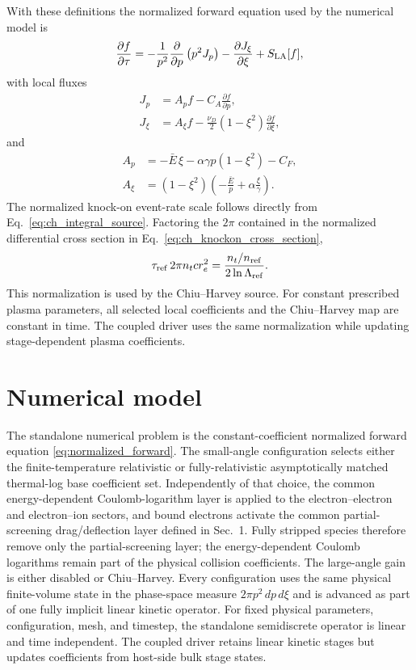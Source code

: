 \documentclass[11pt]{article}
\begin{document}
With these definitions the normalized forward equation used by the numerical model is
\begin{equation}
 \frac{\partial f}{\partial\tau}
 =-\frac{1}{p^2}\frac{\partial}{\partial p}\left(p^2J_p\right)
  -\frac{\partial J_\xi}{\partial\xi}
  +S_{\rm LA}[f],
 \label{eq:normalized_forward}
\end{equation}
with local fluxes
\begin{align}
 J_p
 &=A_p f-C_A\frac{\partial f}{\partial p},
 \label{eq:normalized_Jp}\\
 J_\xi
 &=A_\xi f
   -\frac{\nu_D}{2}(1-\xi^2)\frac{\partial f}{\partial\xi},
 \label{eq:normalized_Jxi}
\end{align}
and
\begin{align}
 A_p
 &=-\bar E\,\xi
   -\alpha\gamma p(1-\xi^2)
   -C_F,
 \label{eq:normalized_Ap}\\
 A_\xi
 &=(1-\xi^2)
   \left(-\frac{\bar E}{p}+\alpha\frac{\xi}{\gamma}\right).
 \label{eq:normalized_Axi}
\end{align}
The normalized knock-on event-rate scale follows directly from
Eq.~\eqref{eq:ch_integral_source}.  Factoring the $2\pi$ contained in the normalized
differential cross section in Eq.~\eqref{eq:ch_knockon_cross_section},
\begin{equation}
 \tau_{\rm ref}\,2\pi n_t c r_e^2
 =\frac{n_t/n_{\rm ref}}{2\ln\Lambda_{\rm ref}}.
 \label{eq:normalized_knockon_scale}
\end{equation}
This normalization is used by the Chiu--Harvey source.  For constant prescribed plasma
parameters, all selected local coefficients and the Chiu--Harvey map are constant in
time.  The coupled driver uses the same normalization while updating stage-dependent
plasma coefficients.

\section{Numerical model}

The standalone numerical problem is the constant-coefficient normalized forward equation
\eqref{eq:normalized_forward}.  The small-angle configuration selects either the
finite-temperature relativistic or fully-relativistic asymptotically matched thermal-log
base coefficient set.  Independently of that choice, the common energy-dependent
Coulomb-logarithm layer is applied to the electron--electron and electron--ion sectors,
and bound electrons activate the common partial-screening drag/deflection layer defined
in Sec.~1.  Fully stripped species therefore remove only the partial-screening layer; the
energy-dependent Coulomb logarithms remain part of the physical collision coefficients.
The large-angle gain is either disabled or Chiu--Harvey.  Every configuration uses the same physical
finite-volume state in the phase-space measure $2\pi p^2\,dp\,d\xi$ and is advanced as
part of one fully implicit linear kinetic operator.  For fixed physical parameters,
configuration, mesh, and timestep, the standalone semidiscrete operator is linear and
time independent.  The coupled driver retains linear kinetic stages but updates
coefficients from host-side bulk stage states.
\end{document}
